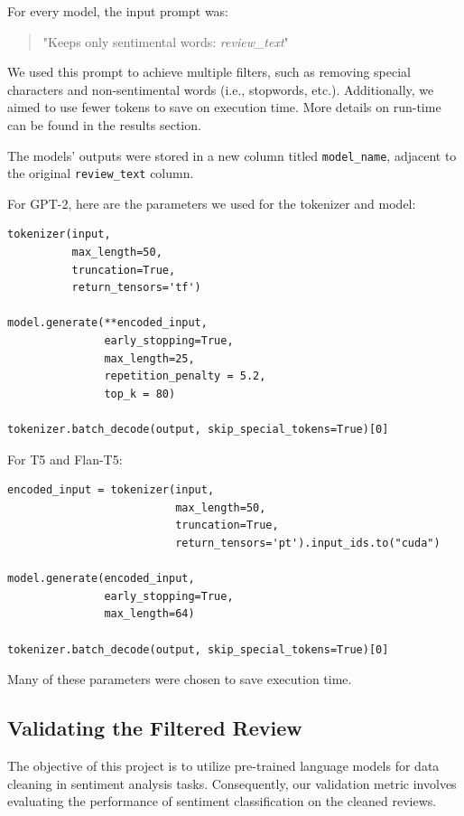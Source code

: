 \documentclass{article}
\begin{document}
For every model, the input prompt was: 

\begin{quote}
    "Keeps only sentimental words: \textit{review\_text}"
\end{quote}

We used this prompt to achieve multiple filters, such as removing special characters and non-sentimental words (i.e., stopwords, etc.). Additionally, we aimed to use fewer tokens to save on execution time. More details on run-time can be found in the results section.

The models' outputs were stored in a new column titled \texttt{model\_name}, adjacent to the original \texttt{review\_text} column.

For GPT-2, here are the parameters we used for the tokenizer and model:

\begin{verbatim}
tokenizer(input,
          max_length=50, 
          truncation=True, 
          return_tensors='tf')

model.generate(**encoded_input, 
               early_stopping=True,
               max_length=25,
               repetition_penalty = 5.2,
               top_k = 80)

tokenizer.batch_decode(output, skip_special_tokens=True)[0]
\end{verbatim}

For T5 and Flan-T5:

\begin{verbatim}
encoded_input = tokenizer(input,
                          max_length=50, 
                          truncation=True, 
                          return_tensors='pt').input_ids.to("cuda")

model.generate(encoded_input, 
               early_stopping=True,
               max_length=64)

tokenizer.batch_decode(output, skip_special_tokens=True)[0]
\end{verbatim}

Many of these parameters were chosen to save execution time.


\subsection{Validating the Filtered Review}

The objective of this project is to utilize pre-trained language models for data cleaning in sentiment analysis tasks. Consequently, our validation metric involves evaluating the performance of sentiment classification on the cleaned reviews.
\end{document}

